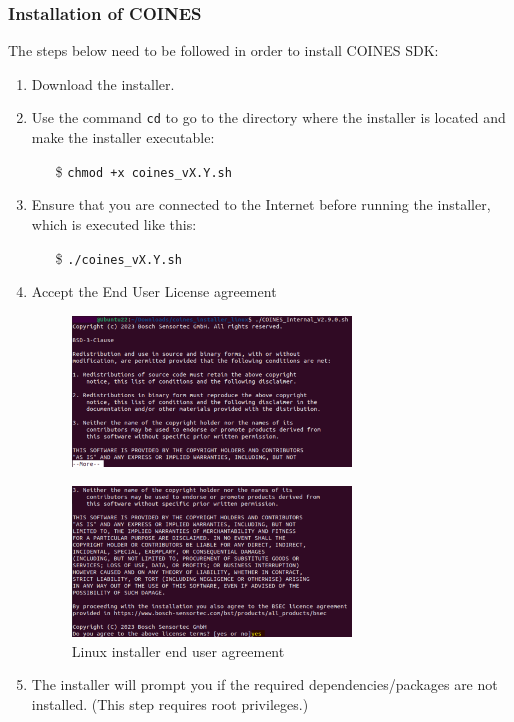\documentclass{article}
\begin{document}
\subsubsection{Installation of COINES}
The steps below need to be followed in order to install COINES SDK:
\begin{enumerate}
	\item Download the installer.
	\item Use the command \texttt{cd} to go to the directory where the installer is located and make the installer executable:
	\begin{itemize}
		\item[\$] \texttt{chmod +x coines\_vX.Y.sh}
	\end{itemize}
	\item Ensure that you are connected to the Internet before running the installer, which is executed like this:
	\begin{itemize}
	\item[\$] \texttt{./coines\_vX.Y.sh}
	\end{itemize}	
	\item Accept the End User License agreement
	\begin{figure}[H]
		\begin{center}
			\includegraphics[width=0.7\textwidth]{coinesAPI_images/Linux_installation_user_agreement.png}
		\end{center}
	\end{figure}
	\begin{figure}[H]
		\begin{center}
			\includegraphics[width=0.7\textwidth]{coinesAPI_images/Linux_installation_user_agreement_1.png}
			\caption{Linux installer end user agreement}
		\end{center}
	\end{figure}
	\item The installer will prompt you if the required dependencies/packages are not installed. (This step requires root privileges.)
\end{enumerate}
\end{document}
